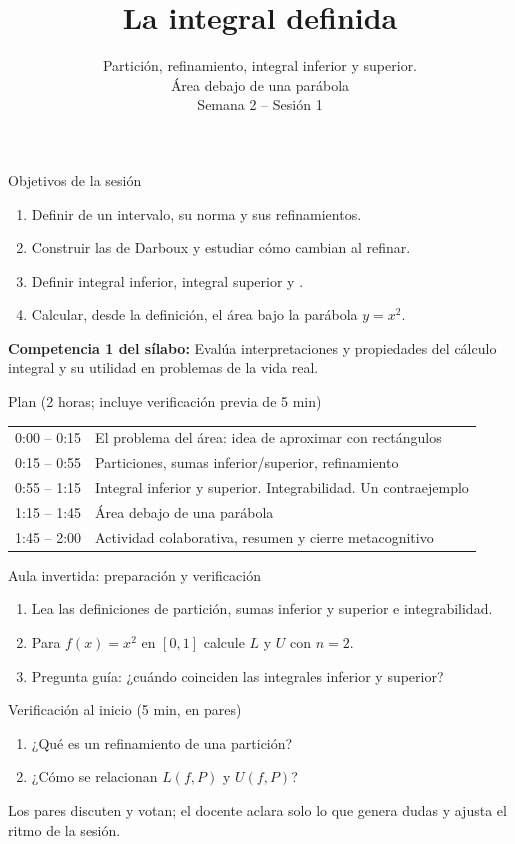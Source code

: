 \documentclass[10pt,aspectratio=169]{beamer}
\title[La integral definida]{La integral definida}
\subtitle{Partición, refinamiento, integral inferior y superior.\\Área debajo de una parábola\\[2pt]\small Semana 2 -- Sesión 1}
\begin{document}
\begin{frame}
  \titlepage
\end{frame}

\begin{frame}{Objetivos de la sesión}
  \begin{enumerate}
    \item Definir  de un intervalo, su norma y sus refinamientos.
    \item Construir las  de Darboux y estudiar cómo cambian al refinar.
    \item Definir integral inferior, integral superior y .
    \item Calcular, desde la definición, el área bajo la parábola $y=x^2$.
  \end{enumerate}
  \vspace{1mm}
  {\small\textbf{Competencia 1 del sílabo:} Evalúa interpretaciones y propiedades del cálculo integral y su utilidad en problemas de la vida real.}
  \begin{block}{Plan (2 horas; incluye verificación previa de 5 min)}
    \begin{tabular}{ll}
      0:00 -- 0:15 & El problema del área: idea de aproximar con rectángulos\\
      0:15 -- 0:55 & Particiones, sumas inferior/superior, refinamiento\\
      0:55 -- 1:15 & Integral inferior y superior. Integrabilidad. Un contraejemplo\\
      1:15 -- 1:45 & Área debajo de una parábola\\
      1:45 -- 2:00 & Actividad colaborativa, resumen y cierre metacognitivo
    \end{tabular}
  \end{block}
\end{frame}

\begin{frame}{Aula invertida: preparación y verificación}
  \small
  \begin{previa}
    \begin{enumerate}
      \item Lea las definiciones de partición, sumas inferior y superior e integrabilidad.
      \item Para $f(x)=x^2$ en $[0,1]$ calcule $L$ y $U$ con $n=2$.
      \item Pregunta guía: ¿cuándo coinciden las integrales inferior y superior?
    \end{enumerate}
  \end{previa}
  \begin{block}{Verificación al inicio (5 min, en pares)}
    \begin{enumerate}
      \item ¿Qué es un refinamiento de una partición?
      \item ¿Cómo se relacionan $L(f,P)$ y $U(f,P)$?
    \end{enumerate}
    Los pares discuten y votan; el docente aclara solo lo que genera dudas y ajusta el ritmo de la sesión.
  \end{block}
\end{frame}
\end{document}
